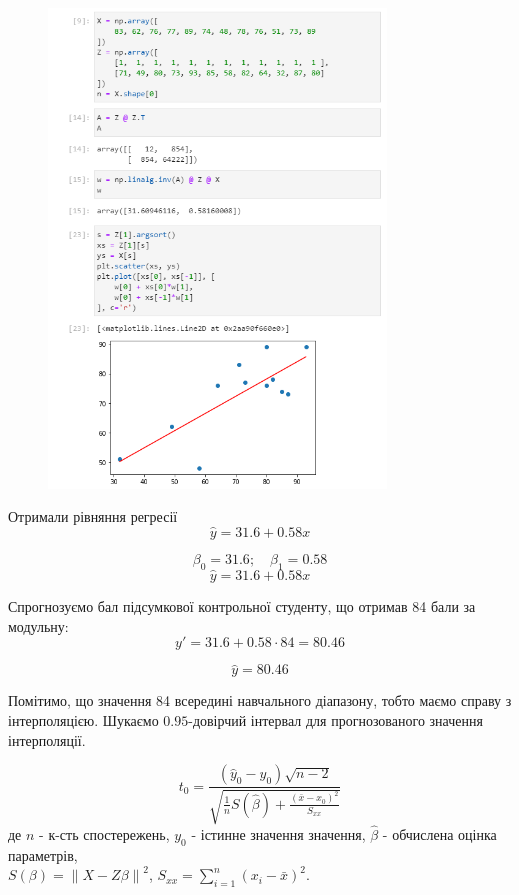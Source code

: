 \documentclass[11pt, a4paper]{article} %
\begin{document}
\begin{figure}[h]
    \centering
    \includegraphics[width=0.8\textwidth]{task4.png}
\end{figure}
\pagebreak

Отримали рівняння регресії
$$\hat y = 31.6 + 0.58 x$$

\begin{mdframed}[style=ans]
    $$\beta_0 = 31.6;\quad \beta_1 = 0.58$$
    $$\hat y = 31.6 + 0.58 x$$
\end{mdframed}

Спрогнозуємо бал підсумкової контрольної студенту, що отримав 84 бали за модульну:
$$y' = 31.6 + 0.58 \cdot 84 = 80.46$$

\begin{mdframed}[style=ans]
    $$\hat y = 80.46$$
\end{mdframed}

Помітимо, що значення 84 всередині навчального діапазону, тобто маємо справу з інтерполяцією.
Шукаємо $0.95$-довірчий інтервал для прогнозованого значення інтерполяції.

$$t_0 = \frac{(\hat y_0 - y_0) \sqrt{n-2}}{\sqrt{\frac{1}{n}S(\hat \beta) + \frac{(\bar x - x_0)^2}{S_{xx}}}}$$
де $n$ - к-сть спостережень, $y_0$ - істинне значення значення, $\hat \beta$ - обчислена оцінка параметрів, \\ 
$S(\beta) = \left\|X - Z\beta\right\|^2$, \quad
$S_{xx} = \sum_{i=1}^n (x_i-\bar x)^2$.
\end{document}
